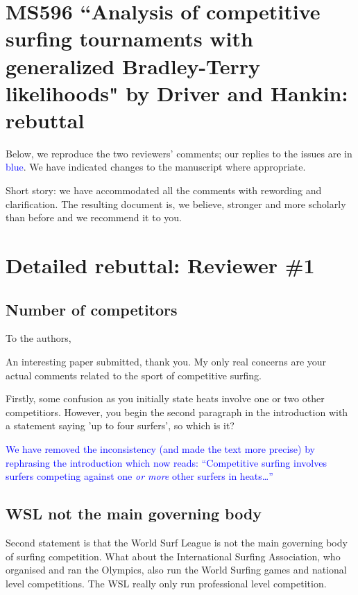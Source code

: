 \documentclass[12pt]{article}
\begin{document}
\section*{MS596 ``Analysis of competitive surfing tournaments with generalized Bradley-Terry likelihoods" by Driver and Hankin: rebuttal}

Below, we reproduce the two reviewers' comments; our replies to the
issues are in \textcolor{blue}{blue}.  We have indicated changes to
the manuscript where appropriate.

Short story: we have accommodated all the comments with rewording and
clarification.  The resulting document is, we believe, stronger and
more scholarly than before and we recommend it to you.

\section*{Detailed rebuttal: Reviewer \#1}



\subsection*{Number of competitors}

To the authors,

An interesting paper submitted, thank you. My only
real concerns are your actual comments related to the sport of
competitive surfing.

Firstly, some confusion as you initially state heats involve one or
two other competitiors. However, you begin the second paragraph in the
introduction with a statement saying 'up to four surfers', so which is
it?

\textcolor{blue}{We have removed the inconsistency (and made the text
  more precise) by rephrasing the introduction which now reads:
  ``Competitive surfing involves surfers competing against one {\em or
    more} other surfers in heats\ldots''}

\subsection*{WSL not the main governing body}

Second statement is that the World Surf League is not the main
governing body of surfing competition. What about the International
Surfing Association, who organised and ran the Olympics, also run the
World Surfing games and national level competitions. The WSL really
only run professional level competition.
\end{document}
